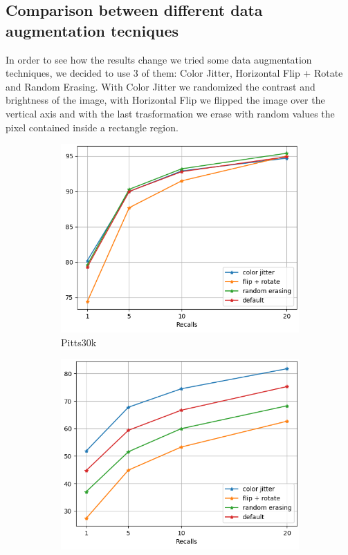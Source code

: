 \documentclass[10pt,twocolumn,letterpaper]{article}
\begin{document}
	\subsection{Comparison between different data augmentation tecniques}
	In order to see how the results change we tried some data augmentation techniques, we decided to use 3 of them: Color Jitter, Horizontal Flip + Rotate and Random Erasing. With Color Jitter we randomized the contrast and brightness of the image, with Horizontal Flip we flipped the image over the vertical axis and with the last trasformation we erase with random values the pixel contained inside a rectangle region.\\
	\begin{figure}[!h]
		\centering
		\begin{subfigure}[b]{0.23\textwidth}
			\centering
			\includegraphics[width=\textwidth]{img/augment/test_pitts30k_recalls_graph.png}
			\caption{Pitts30k}
			\label{fig:recalls:augment:pitts30k}
		\end{subfigure}
		\hfill
		\begin{subfigure}[b]{0.23\textwidth}
			\centering
			\includegraphics[width=\textwidth]{img/augment/test_st_lucia_recalls_graph.png}

\end{subfigure}
\end{figure}
\end{document}
